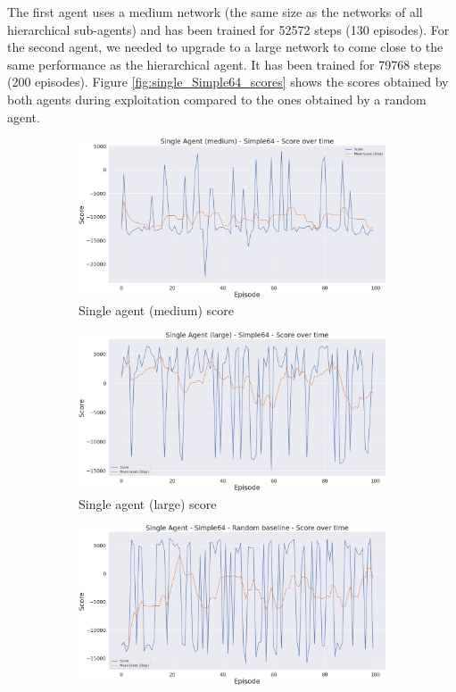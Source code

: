 The first agent uses a medium network (the same size as the networks of all hierarchical sub-agents) and has been trained for 52572 steps (130 episodes). For the second agent, we needed to upgrade to a large network to come close to the same performance as the hierarchical agent. It has been trained for 79768 steps (200 episodes). Figure \ref{fig:single_Simple64_scores} shows the scores obtained by both agents during exploitation compared to the ones obtained by a random agent.

\begin{figure}[t]
    \centering
    \begin{subfigure}[b]{0.48\textwidth}
        \includegraphics[width=1\textwidth]{figs/single_dqn_m_130/exploit/score.png}
        \caption{Single agent (medium) score}
    \end{subfigure}
    \hfill
    \begin{subfigure}[b]{0.48\textwidth}
        \includegraphics[width=1\textwidth]{figs/single_dqn_l_200/exploit/score.png}
        \caption{Single agent (large) score}
    \end{subfigure}
    \hfill
    \begin{subfigure}[b]{0.48\textwidth}
        \includegraphics[width=1\textwidth]{figs/single_random/exploit/score.png}

\end{subfigure}
\end{figure}
